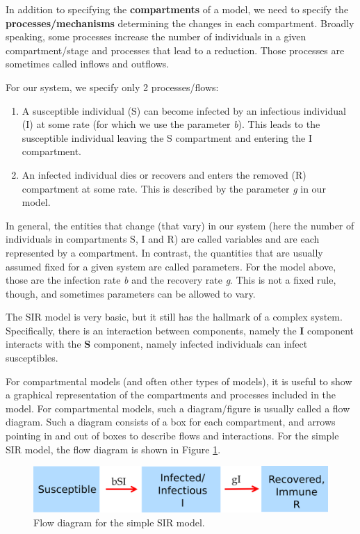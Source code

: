 \documentclass[]{book}
\providecommand{\tightlist}{%
  \setlength{\itemsep}{0pt}\setlength{\parskip}{0pt}}
\theoremstyle{definition}
\theoremstyle{definition}
\theoremstyle{definition}
\theoremstyle{remark}
\begin{document}
In addition to specifying the \textbf{compartments} of a model, we need
to specify the \textbf{processes/mechanisms} determining the changes in
each compartment. Broadly speaking, some processes increase the number
of individuals in a given compartment/stage and processes that lead to a
reduction. Those processes are sometimes called inflows and outflows.

For our system, we specify only 2 processes/flows:

\begin{enumerate}
\def\labelenumi{\arabic{enumi}.}
\tightlist
\item
  A susceptible individual (S) can become infected by an infectious
  individual (I) at some rate (for which we use the parameter \emph{b}).
  This leads to the susceptible individual leaving the S compartment and
  entering the I compartment.\\
\item
  An infected individual dies or recovers and enters the removed (R)
  compartment at some rate. This is described by the parameter \emph{g}
  in our model.
\end{enumerate}

In general, the entities that change (that vary) in our system (here the
number of individuals in compartments S, I and R) are called variables
and are each represented by a compartment. In contrast, the quantities
that are usually assumed fixed for a given system are called parameters.
For the model above, those are the infection rate \emph{b} and the
recovery rate \emph{g}. This is not a fixed rule, though, and sometimes
parameters can be allowed to vary.

The SIR model is very basic, but it still has the hallmark of a complex
system. Specifically, there is an interaction between components, namely
the \textbf{I} component interacts with the \textbf{S} component, namely
infected individuals can infect susceptibles.

For compartmental models (and often other types of models), it is useful
to show a graphical representation of the compartments and processes
included in the model. For compartmental models, such a diagram/figure
is usually called a flow diagram. Such a diagram consists of a box for
each compartment, and arrows pointing in and out of boxes to describe
flows and interactions. For the simple SIR model, the flow diagram is
shown in Figure \ref{fig:basicSIR}.

\begin{figure}
\centering
\includegraphics{./images/basicSIRmodelfigure.png}
\caption{\label{fig:basicSIR}Flow diagram for the simple SIR model.}
\end{figure}
\end{document}

